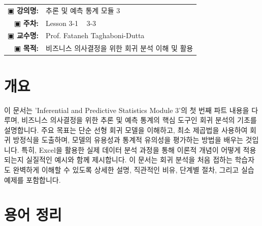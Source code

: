 \documentclass[11pt,a4paper]{article}
\makeatletter
\theoremstyle{definition}
\newcommand{\metainfo}[4]{
\begin{tcolorbox}[
    colback=lightpurple,
    colframe=darkpurple,
    boxrule=1pt,
    arc=2mm,
    left=10pt,
    right=10pt,
    top=8pt,
    bottom=8pt
]
\begin{tabular}{@{}rl@{}}
▣ \textbf{강의명:} & #1 \\[0.3em]
▣ \textbf{주차:} & #2 \\[0.3em]
▣ \textbf{교수명:} & #3 \\[0.3em]
▣ \textbf{목적:} & \begin{minipage}[t]{0.75\textwidth}#4\end{minipage}
\end{tabular}
\end{tcolorbox}
}
\makeatother
\begin{document}
\thispagestyle{firstpage}

\metainfo{추론 및 예측 통계 모듈 3}{Lesson 3-1 ~ 3-3}{Prof. Fataneh Taghaboni-Dutta}{비즈니스 의사결정을 위한 회귀 분석 이해 및 활용}

\tableofcontents

\newpage

\section{개요}

이 문서는 'Inferential and Predictive Statistics Module 3'의 첫 번째 파트 내용을 다루며, 비즈니스 의사결정을 위한 추론 및 예측 통계의 핵심 도구인 회귀 분석의 기초를 설명합니다.
주요 목표는 단순 선형 회귀 모델을 이해하고, 최소 제곱법을 사용하여 회귀 방정식을 도출하며, 모델의 유용성과 통계적 유의성을 평가하는 방법을 배우는 것입니다.
특히, Excel을 활용한 실제 데이터 분석 과정을 통해 이론적 개념이 어떻게 적용되는지 실질적인 예시와 함께 제시합니다.
이 문서는 회귀 분석을 처음 접하는 학습자도 완벽하게 이해할 수 있도록 상세한 설명, 직관적인 비유, 단계별 절차, 그리고 실습 예제를 포함합니다.

\newpage
\section{용어 정리}
\end{document}

